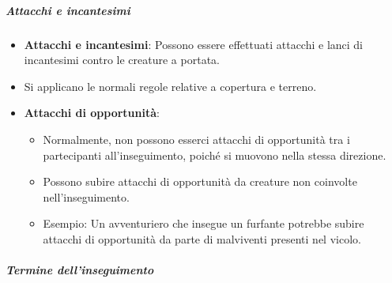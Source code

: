 \subparagraph*{Attacchi e incantesimi}

\begin{itemize}
    \item \textbf{Attacchi e incantesimi}: Possono essere effettuati attacchi e lanci di incantesimi contro le creature a portata.
    \item Si applicano le normali regole relative a copertura e terreno.
    \item \textbf{Attacchi di opportunità}: 
    \begin{itemize}
        \item Normalmente, non possono esserci attacchi di opportunità tra i partecipanti all'inseguimento, poiché si muovono nella stessa direzione.
        \item Possono subire attacchi di opportunità da creature non coinvolte nell'inseguimento.
        \item Esempio: Un avventuriero che insegue un furfante potrebbe subire attacchi di opportunità da parte di malviventi presenti nel vicolo.
    \end{itemize}
\end{itemize}

\subparagraph*{Termine dell'inseguimento}

